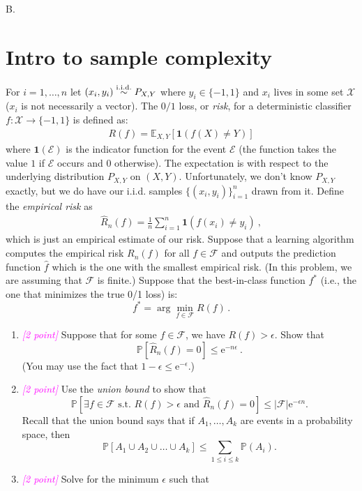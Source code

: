\documentclass{article}
\newcommand{\1}{\mathbf{1}}
\renewcommand{\P}{\mathbb{P}}
\providecommand*{\eu}{\ensuremath{\mathrm{e}}}
\newcommand{\points}[1]{\small\textcolor{magenta}{\emph{[#1 point\ifthenelse{\equal{#1}{1}}{}{s}]}} \normalsize}
\newcounter{bprob}
\newenvironment{bprob}[1][]{\begin{mdframed} \refstepcounter{bprob}\par\medskip
  B\thebprob.#1 }
   { \end{mdframed} }
\begin{document}
\begin{bprob}
\section*{Intro to sample complexity}
For $i=1,\dots,n$ let $(x_i,y_i) \overset{\rm i.i.d.}{\sim} P_{X,Y}$ where $y_i \in \{-1,1\}$ and $x_i$ lives in some set $\mathcal{X}$ ($x_i$ is not necessarily a vector). 
The $0/1$ loss, or \emph{risk}, for a deterministic classifier $f\colon \mathcal{X} \rightarrow \{ -1,1 \}$ is defined as:
\begin{align*}
R(f) = \mathbb E_{X,Y} [\1(f(X)\neq Y)]
\end{align*}
where $\1(\mathcal{E})$ is the indicator function for the event $\mathcal{E}$ (the
function takes the value $1$ if $\mathcal{E}$ occurs and $0$ otherwise).
The expectation is with respect to the underlying distribution $P_{X,Y}$ on $(X,Y)$.
Unfortunately, we don't know $P_{X,Y}$ exactly, but we do have our i.i.d. samples $\{(x_i,y_i)\}_{i=1}^n$ drawn from it.
Define the \emph{empirical risk} as 
\begin{align*}
\widehat R_n(f) = \frac{1}{n} \sum_{i=1}^n \mathbf{1}(f(x_i)\neq y_i)\ ,
\end{align*}
which is just an empirical estimate of our risk.
Suppose that a learning algorithm computes the empirical risk $R_n(f)$ for all $f \in \mathcal{F}$ and outputs the prediction function $\widehat f$ which is the one with the smallest empirical risk.  (In this problem, we are assuming that  $\mathcal{F}$ is finite.) Suppose that the best-in-class function  $f^*$ (i.e., the one that minimizes the true 0/1 loss)
 is:
\[
  f^* = \arg\min_{f \in \mathcal{F}} R(f) \, . 
\]
\begin{enumerate}
\item \points{2} Suppose that for some $f \in \mathcal{F}$, we have $R(f) > \epsilon$. 
Show that
\[
    \P\left[ \widehat{R}_n(f) = 0 \right] \leq \eu^{-n \epsilon}\ .
\]
(You may use the fact that $1-\epsilon \le \eu^{-\epsilon}$.)
\item \points{2} Use the {\em union bound} to show that
$$\P \left[\exists f \in \mathcal{F}\text{ s.t. } R(f) > \epsilon \text{ and }  \widehat{R}_n(f) = 0 \right] \le \lvert\mathcal{F}\rvert \eu^{-\epsilon n}.$$
Recall that the union bound says that if $A_1, \ldots, A_k$ are events in a probability space, then 
\[
    \P\left[A_1 \cup A_2 \cup \ldots \cup A_k\right] \le \sum_{1\le i \le k} \P(A_i).
\]
\item \points{2} Solve for the minimum $\epsilon$ such that

\end{enumerate}
\end{bprob}
\end{document}
